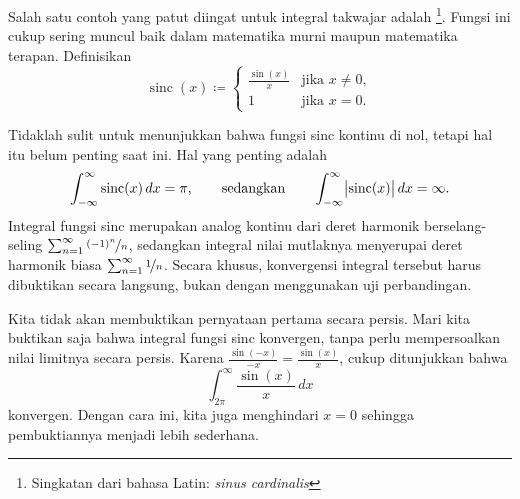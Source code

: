\begin{example}
Salah satu contoh yang patut diingat untuk integral takwajar
adalah \emph{}%
\footnote{Singkatan dari bahasa Latin: \emph{sinus cardinalis}}.
Fungsi ini cukup sering muncul
baik dalam matematika murni maupun matematika terapan.  Definisikan
\begin{equation*}
\operatorname{sinc}(x) \coloneqq
\begin{cases}
\frac{\sin(x)}{x} & \text{jika } x \neq 0 , \\
1 & \text{jika } x = 0 .
\end{cases}
\end{equation*}
\begin{myfigureht}
\caption{Fungsi sinc.\label{figsinc}}
\end{myfigureht}

Tidaklah sulit untuk menunjukkan bahwa
fungsi sinc kontinu di nol, tetapi hal itu
belum penting saat ini.  Hal yang penting adalah
\begin{equation*}
\int_{-\infty}^\infty \operatorname{sinc}(x) \,dx = \pi ,
\qquad \text{sedangkan} \qquad
\int_{-\infty}^\infty \bigl\lvert {\operatorname{sinc}(x)} \bigr\rvert \,dx = \infty .
\end{equation*}
Integral fungsi sinc merupakan analog kontinu dari
deret harmonik berselang-seling $\sum_{n=1}^\infty \nicefrac{{(-1)}^n}{n}$, sedangkan integral
nilai mutlaknya menyerupai deret harmonik biasa $\sum_{n=1}^\infty \nicefrac{1}{n}$.
Secara khusus, konvergensi integral tersebut harus dibuktikan secara langsung,
bukan dengan menggunakan uji perbandingan.

Kita tidak akan membuktikan pernyataan pertama secara persis.  Mari kita buktikan saja
bahwa integral fungsi sinc konvergen, tanpa perlu mempersoalkan
nilai limitnya secara persis.  Karena $\frac{\sin(-x)}{-x} = \frac{\sin(x)}{x}$, cukup
ditunjukkan bahwa
\begin{equation*}
\int_{2\pi}^\infty \frac{\sin(x)}{x}\,dx
\end{equation*}
konvergen.  Dengan cara ini, kita
juga menghindari $x=0$ sehingga pembuktiannya menjadi lebih sederhana.


\end{example}
